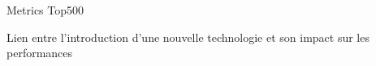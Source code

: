 %
\begin{Frame}{Metrics Top500}

    Lien entre l'introduction d'une nouvelle technologie et son impact
    sur les performances
\end{Frame}


